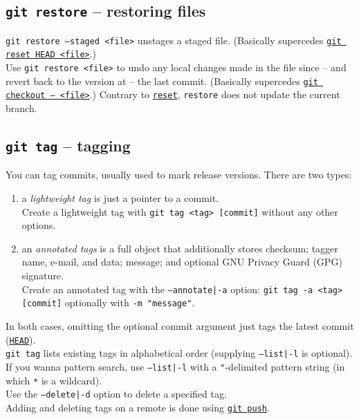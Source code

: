 \documentclass[table, xcdraw]{article}%
\begin{document}
\subsection{\texttt{git restore} -- restoring files} \label{restore}

\texttt{git restore --staged <file>} unstages a staged file. (Basically supercedes \hyperref[reset]{\texttt{git reset HEAD <file>}}.)\\
Use \texttt{git restore <file>} to undo any local changes made in the file since -- and revert back to the version at -- the last commit. (Basically supercedes \hyperref[checkout]{\texttt{git checkout -- <file>}}.)
Contrary to \hyperref[reset]{\texttt{reset}}, \texttt{restore} does not update the current branch.

\subsection{\texttt{git tag} -- tagging} \label{tag}

You can tag commits, usually used to mark release versions. There are two types:

\begin{enumerate}
    \item a \emph{lightweight tag} is just a pointer to a commit.\\
    Create a lightweight tag with \texttt{git tag <tag> [commit]} without any other options.
    \item an \emph{annotated tags} is a full object that additionally stores checksum; tagger name, e-mail, and data; message; and optional GNU Privacy Guard (GPG) signature.\\
    Create an annotated tag with the \texttt{--annotate|-a} option: \texttt{git tag -a <tag> [commit]} optionally with \texttt{-m "message"}.
\end{enumerate}

In both cases, omitting the optional commit argument just tags the latest commit (\hyperref[branching]{\texttt{HEAD}}).\\
\texttt{git tag} lists existing tags in alphabetical order (supplying \texttt{--list|-l} is optional).\\
If you wanna pattern search, use \texttt{--list|-l} with a \texttt{"}-delimited pattern string (in which \texttt{*} is a wildcard).\\
Use the \texttt{--delete|-d} option to delete a specified tag.\\
Adding and deleting tags on a remote is done using \hyperref[push]{\texttt{git push}}.
\end{document}
